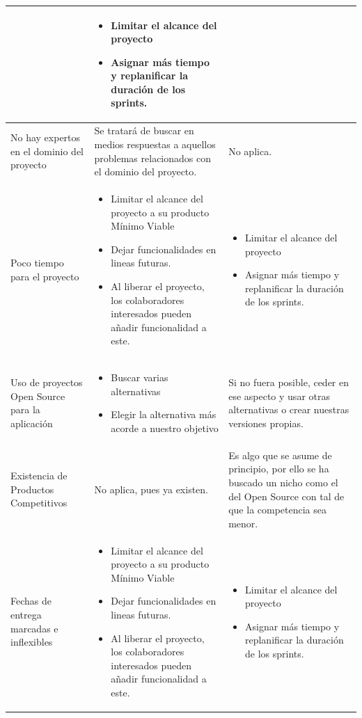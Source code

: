 \begin{center}
\begin{xltabular}{\textwidth}{|X|X|X|}
\begin{itemize}
		\end{itemize} & \begin{itemize}
			\item Limitar el alcance del proyecto
			\item Asignar más tiempo y replanificar la duración de los sprints.
		\end{itemize}\\
		\hline
		No hay expertos en el dominio del proyecto & Se tratará de buscar en medios respuestas a aquellos problemas relacionados con el dominio del proyecto. & No aplica. \\
		\hline
		Poco tiempo para el proyecto & \begin{itemize}
			\item Limitar el alcance del proyecto a su producto Mínimo Viable
			\item Dejar funcionalidades en lineas futuras.
			\item Al liberar el proyecto, los colaboradores interesados pueden añadir funcionalidad a este.
		\end{itemize} & \begin{itemize}
			\item Limitar el alcance del proyecto
			\item Asignar más tiempo y replanificar la duración de los sprints.
			\end{itemize} \\
		\hline
		Uso de proyectos Open Source para la aplicación & \begin{itemize}
			\item Buscar varias alternativas
			\item Elegir la alternativa más acorde a nuestro objetivo
		\end{itemize} & Si no fuera posible, ceder en ese aspecto y usar otras alternativas o crear nuestras versiones propias.\\
		\hline
		Existencia de Productos Competitivos & No aplica, pues ya existen. & Es algo que se asume de principio, por ello se ha buscado un nicho como el del Open Source con tal de que la competencia sea menor. \\
		\hline
		Fechas de entrega marcadas e inflexibles & \begin{itemize}
			\item Limitar el alcance del proyecto a su producto Mínimo Viable
			\item Dejar funcionalidades en lineas futuras.
			\item Al liberar el proyecto, los colaboradores interesados pueden añadir funcionalidad a este.
		\end{itemize} & \begin{itemize}
			\item Limitar el alcance del proyecto
			\item Asignar más tiempo y replanificar la duración de los sprints.
			\end{itemize} \\
		\hline
		

\end{xltabular}
\end{center}
